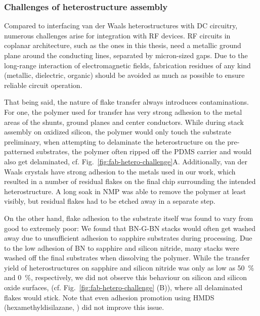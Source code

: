 \subsubsection{Challenges of heterostructure assembly}

Compared to interfacing van der Waals heterostructures with DC circuitry, numerous challenges arise for integration with RF devices.
%
RF circuits in coplanar architecture, such as the ones in this thesis, need a metallic ground plane around the conducting lines, separated by micron-sized gaps.
%
Due to the long-range interaction of electromagnetic fields, fabrication residues of any kind (metallic, dielectric, organic) should be avoided as much as possible to ensure reliable circuit operation.


That being said, the nature of flake transfer always introduces contaminations.
%
For one, the polymer used for transfer has very strong adhesion to the metal areas of the shunts, ground planes and center conductors.
%
While during stack assembly on oxidized silicon, the polymer would only touch the substrate preliminary, when attempting to delaminate the heterostructure on the pre-patterned substrates, the polymer often ripped off the PDMS carrier and would also get delaminated, cf. Fig.~\ref{fig:fab-hetero-challenge}A.
%
Additionally, van der Waals crystals have strong adhesion to the metals used in our work, which resulted in a number of residual flakes on the final chip surrounding the intended heterostructure.
%
A long soak in NMP was able to remove the polymer at least visibly, but residual flakes had to be etched away in a separate step.


On the other hand, flake adhesion to the substrate itself was found to vary from good to extremely poor:
%
We found that BN-G-BN stacks would often get washed away due to unsufficient adhesion to sapphire substrates during processing.
%
Due to the low adhesion of BN to sapphire and silicon nitride, many stacks were washed off the final substrates when dissolving the polymer.
%
While the transfer yield of heterostructures on sapphire and silicon nitride was only as low as \SI{50}{\percent} and \SI{0}{\percent}, respectively, we did not observe this behaviour on silicon and silicon oxide surfaces, (cf. Fig.~\ref{fig:fab-hetero-challenge} (B)), where all delaminated flakes would stick.
%
Note that even adhesion promotion using HMDS (hexamethyldisilazane, ) did not improve this issue.


